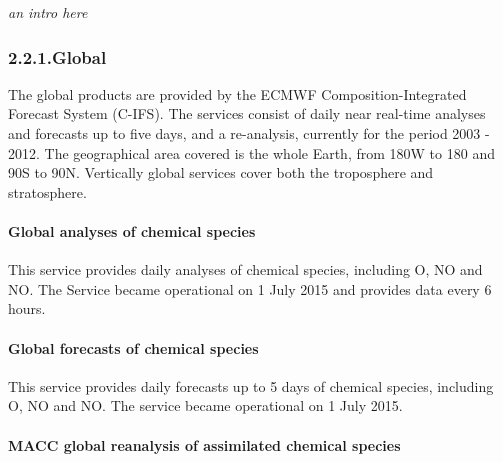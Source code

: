 \documentclass[9pt]{report}
\begin{document}
\noindent{}\emph{an intro here}%

\subsubsection{2.2.1.\hspace*{0.5em}Global}\label{sec-global}%

\noindent{}The global products are provided by the ECMWF Composition-Integrated Forecast System (C-IFS).
The services consist of daily near real-time analyses and forecasts up to five days, and a re-analysis, currently for the period 2003 - 2012. 
The geographical area covered is the whole Earth, from 180\textdegree{}W to 180\textdegree{} and 90\textdegree{}S to 90\textdegree{}N. 
Vertically global services cover both the troposphere and stratosphere.%

\paragraph{Global analyses of chemical species}\label{sec-global-analyses-of-chemical-species}%

\noindent{}This service provides daily analyses of chemical species, including O, NO and NO. 
The Service became operational on 1 July 2015 and provides data every 6 hours.%

\paragraph{Global forecasts of chemical species}\label{sec-global-forecasts-of-chemical-species}%

\noindent{}This service provides daily forecasts up to 5 days of chemical species, including O, NO and NO. 
The service became operational on 1 July 2015.%

\paragraph{MACC global reanalysis of assimilated chemical species}\label{sec-macc-global-reanalysis-of-assimilated-chemical-species}%
\end{document}
